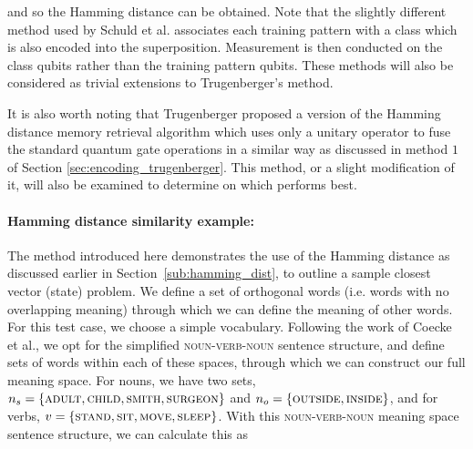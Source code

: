 \noindent and so the Hamming distance can be obtained. Note that the slightly different method used by Schuld et al. \cite{Schuld_Sinayskiy_Petruccione_2014} associates each training pattern with a class which is also encoded into the superposition. Measurement is then conducted on the class qubits rather than the training pattern qubits. These methods will also be considered as trivial extensions to Trugenberger's method.

It is also worth noting that Trugenberger proposed a version of the Hamming distance memory retrieval algorithm which uses only a unitary operator to fuse the standard quantum gate operations in a similar way as discussed in method $1$ of Section \ref{sec:encoding_trugenberger}. This method, or a slight modification of it, will also be examined to determine on which performs best.  


\iftrue
\paragraph{Hamming distance similarity example:}\label{par:example_hamming}
The method introduced here demonstrates the use of the Hamming distance as discussed earlier in Section~\ref{sub:hamming_dist}, to outline a sample closest vector (state) problem.
We define a set of orthogonal words (i.e. words with no overlapping meaning) through which we can define the meaning of other words. For this test case, we choose a simple vocabulary. Following the work of Coecke et al., we opt for the simplified \textsc{noun-verb-noun} sentence structure, and define sets of words within each of these spaces, through which we can construct our full meaning space. For nouns, we have two sets, $n_s = \{\textsc{adult},\textsc{child},\textsc{smith},\textsc{surgeon}\}$ and $n_o = \{\textsc{outside},\textsc{inside}\}$, and for verbs, $v = \{\textsc{stand},\textsc{sit},\textsc{move},\textsc{sleep}\}$. With this \textsc{noun-verb-noun} meaning space sentence structure, we can calculate this as

